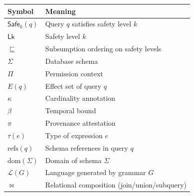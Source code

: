 \documentclass[11pt,a4paper]{article}
\newcommand{\LevelN}[1]{\textsf{L#1}}
\newcommand{\Safe}[1]{\ensuremath{\mathsf{Safe}_{#1}}}
\newcommand{\Leq}{\ensuremath{\sqsubseteq}}
\begin{document}
\begin{center}
\begin{tabular}{ll}
\toprule
\textbf{Symbol} & \textbf{Meaning} \\
\midrule
$\Safe{k}(q)$ & Query $q$ satisfies safety level $k$ \\
$\LevelN{k}$ & Safety level $k$ \\
$\Leq$ & Subsumption ordering on safety levels \\
$\Sigma$ & Database schema \\
$\Pi$ & Permission context \\
$E(q)$ & Effect set of query $q$ \\
$\kappa$ & Cardinality annotation \\
$\beta$ & Temporal bound \\
$\pi$ & Provenance attestation \\
$\tau(e)$ & Type of expression $e$ \\
$\mathrm{refs}(q)$ & Schema references in query $q$ \\
$\mathrm{dom}(\Sigma)$ & Domain of schema $\Sigma$ \\
$\mathcal{L}(G)$ & Language generated by grammar $G$ \\
$\bowtie$ & Relational composition (join/union/subquery) \\
\bottomrule
\end{tabular}
\end{center}
\end{document}
